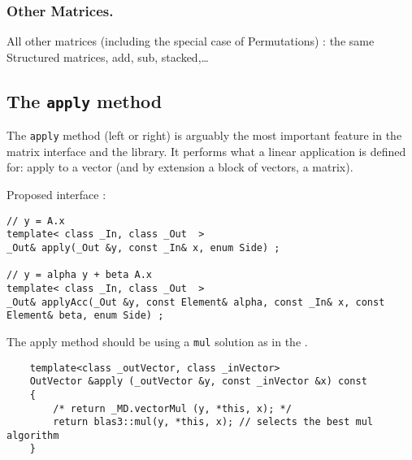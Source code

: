\subsubsection{Other Matrices.}
%
All other matrices (including the special case of Permutations) : the same
Structured matrices, add, sub, stacked,\dots
%
\subsection{The \texttt{apply} method}
%
The \texttt{apply} method (left or right) is arguably the most important feature in the
matrix interface and the \linbox library. It performs what a linear application is defined for:
apply to a vector (and by extension  a block of vectors, \ie a matrix).
%
\par
%
Proposed interface :
%
{
\begin{lstlisting}
// y = A.x
template< class _In, class _Out  >
_Out& apply(_Out &y, const _In& x, enum Side) ;

// y = alpha y + beta A.x
template< class _In, class _Out  >
_Out& applyAcc(_Out &y, const Element& alpha, const _In& x, const Element& beta, enum Side) ;

\end{lstlisting}
}
%
The apply method should be using a \texttt{mul} solution as in the .
{
	\begin{lstlisting}
	template<class _outVector, class _inVector>
	OutVector &apply (_outVector &y, const _inVector &x) const
	{
		/* return _MD.vectorMul (y, *this, x); */
		return blas3::mul(y, *this, x); // selects the best mul algorithm
	}
	\end{lstlisting}
}

